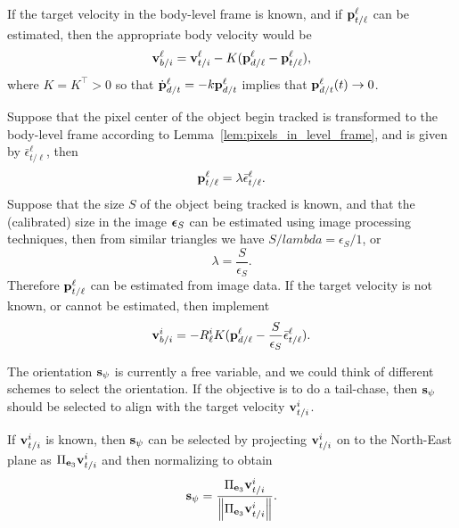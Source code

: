If the target velocity in the body-level frame is known, and if $\mathbf{p}_{t/\ell}^\ell$ can be estimated, then the appropriate body velocity would be
\begin{equation} \label{eq:tracking_body_velocity}
\vbf_{b/i}^\ell = \vbf_{t/i}^\ell - K(\pbf_{d/\ell}^\ell - \pbf_{t/\ell}^\ell),
\end{equation}
where $K=K^\top>0$ so that $\dot{\mathbf{p}}_{d/t}^\ell = -k\mathbf{p}_{d/t}^\ell$ implies that $\mathbf{p}_{d/t}^\ell(t)\to 0$.  

Suppose that the pixel center of the object begin tracked is transformed to the body-level frame according to Lemma~\ref{lem:pixels_in_level_frame}, and is given by $\bar{\epsilon}_{t/\ell}^\ell$, then 
\[
\mathbf{p}_{t/\ell}^\ell = \lambda \bar{\epsilon}_{t/\ell}^\ell.
\]
Suppose that the size $S$ of the object being tracked is known, and that the (calibrated) size in the image $\boldsymbol{\epsilon}_S$ can be estimated using image processing techniques, then from similar triangles we have $S/lambda = \epsilon_S/1$, or 
\[
\lambda = \frac{S}{\epsilon_S}.
\]
Therefore $\mathbf{p}_{t/\ell}^\ell$ can be estimated from image data.  If the target velocity is not known, or cannot be estimated, then implement
\begin{equation}\label{eq:target_following_velocity}
\vbf_{b/i}^i = - R_\ell^i K(\pbf_{d/\ell}^\ell - \frac{S}{\epsilon_S}\bar{\epsilon}_{t/\ell}^\ell).
\end{equation}

The orientation $\mathbf{s}_\psi$ is currently a free variable, and we could think of different schemes to select the orientation.  If the objective is to do a tail-chase, then $\mathbf{s}_\psi$ should be selected to align with the target velocity $\mathbf{v}_{t/i}^i$. 

If $\mathbf{v}_{t/i}^i$ is known, then $\mathbf{s}_\psi$ can be selected by projecting $\mathbf{v}_{t/i}^i$ on to the North-East plane as $\Pi_{\mathbf{e}_3}\mathbf{v}_{t/i}^i$ and then normalizing to obtain
\begin{equation}\label{eq:tracking_heading_vector}
\sbf_{\psi} = \frac{\Pi_{\ebf_3}\vbf_{t/i}^i}{\norm{\Pi_{\ebf_3}\vbf_{t/i}^i}}.
\end{equation}

